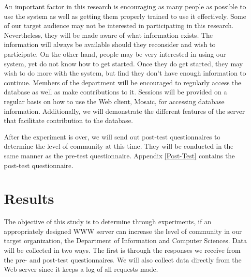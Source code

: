 An important factor in this research is encouraging as many people as
possible to use the system as well as getting them properly trained to use
it effectively.  Some of our target audience may not be interested in
participating in this research.  Nevertheless, they will be made aware of
what information exists.  The information will always be available should
they reconsider and wish to participate.  On the other hand, people may be
very interested in using our system, yet do not know how to get started.
Once they do get started, they may wish to do more with the system, but
find they don't have enough information to continue.  Members of the
department will be encouraged to regularly access the database as well as
make contributions to it.  Sessions will be provided on a regular basis on
how to use the Web client, Mosaic, for accessing database information.
Additionally, we will demonstrate the different features of the server that
facilitate contribution to the database.

After the experiment is over, we will send out post-test questionnaires to
determine the level of community at this time.  They will be conducted in
the same manner as the pre-test questionnaire.  Appendix \ref{Post-Test}
contains the post-test questionnaire.

\section{Results}


The objective of this study is to determine through experiments, if an
appropriately designed WWW server can increase the level of community in
our target organization, the Department of Information and Computer
Sciences.  Data will be collected in two ways.  The first is through the
responses we receive from the pre- and post-test questionnaires.  We will
also collect data directly from the Web server since it keeps a log of all
requests made.

